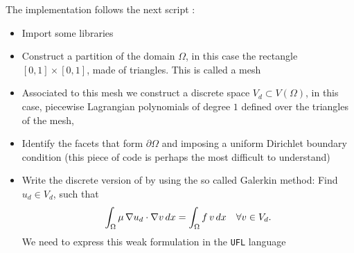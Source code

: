 The implementation follows the next script :

\begin{itemize}

\item Import some libraries
\vspace{-0.5cm}
\begin{center}
\begin{minipage}{1.0\textwidth}
    
\end{minipage}
\end{center}

\item Construct a partition of the domain $\Omega$,
in this case the rectangle $[0,1] \times [0,1]$,
made of triangles. This is called a mesh
\vspace{-0.5cm}
\begin{center}
\begin{minipage}{1.0\textwidth}
    
\end{minipage}
\end{center}

\item Associated to this mesh we construct a discrete space
$V_d \subset V(\Omega)$, in this case, piecewise Lagrangian polynomials of degree
$1$ defined over the triangles of the mesh, 
\vspace{-0.5cm}
\begin{center}
\begin{minipage}{1.0\textwidth}
    
\end{minipage}
\end{center}

\item Identify the facets that form $\partial{\Omega}$
and imposing a uniform Dirichlet
boundary condition (this piece of code is perhaps the most
difficult to understand)
\vspace{-0.5cm}
\begin{center}
\begin{minipage}{1.0\textwidth}
    
\end{minipage}
\end{center}

\item Write the discrete version of 
by using the so called Galerkin method: Find $u_d \in V_d$, such that
\begin{equation}
\int_{\Omega}{\mu\,\nabla{u}_d\cdot \nabla{v}}\,dx =
        \int_{\Omega}{f\,v}\,dx ~~~\forall v \in V_d. \labeq{poissonbasicfinaldisc}
\end{equation}
We need to express this weak formulation in the \texttt{UFL} language
\vspace{-0.5cm}
\begin{center}
\begin{minipage}{1.0\textwidth}
    
\end{minipage}
\end{center}


\end{itemize}

